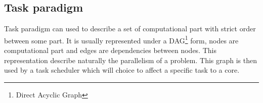 \subsection{Task paradigm}
Task paradigm can used to describe a set of computational part with strict order between some part.
%
It is usually represented under a DAG\footnote{Direct Acyclic Graph} form, nodes are computational part and edges are dependencies between nodes.
%
This representation describe naturally the parallelism of a problem.
%
This graph is then used by a task scheduler which will choice to affect a specific task to a core.
